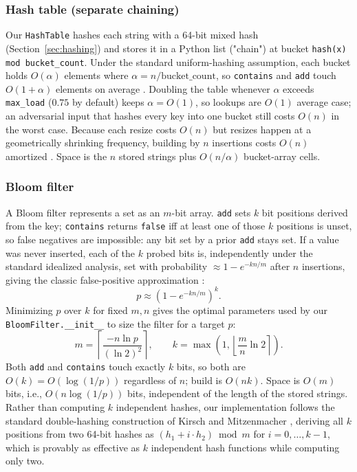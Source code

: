 \documentclass[acmsmall,screen,nonacm=true]{acmart}
\begin{document}
\subsubsection{Hash table (separate chaining)}
Our \texttt{HashTable} hashes each string with a 64-bit mixed hash
(Section~\ref{sec:hashing}) and stores it in a Python list ("chain") at
bucket \texttt{hash(x) mod bucket\_count}. Under the standard uniform-hashing
assumption, each bucket holds $O(\alpha)$ elements where $\alpha=n/\text{bucket\_count}$,
so \texttt{contains} and \texttt{add} touch $O(1+\alpha)$ elements on
average \cite{cormen2009}. Doubling the table whenever $\alpha$ exceeds
\texttt{max\_load} ($0.75$ by default) keeps $\alpha=O(1)$, so lookups are
$O(1)$ average case; an adversarial input that hashes every key into one
bucket still costs $O(n)$ in the worst case. Because each resize costs
$O(n)$ but resizes happen at a geometrically shrinking frequency, building
by $n$ insertions costs $O(n)$ amortized \cite{cormen2009}. Space is the
$n$ stored strings plus $O(n/\alpha)$ bucket-array cells.

\subsubsection{Bloom filter}
\label{sec:bloom-theory}
A Bloom filter \cite{bloom1970} represents a set as an $m$-bit array.
\texttt{add} sets $k$ bit positions derived from the key; \texttt{contains}
returns \texttt{false} iff at least one of those $k$ positions is unset, so
false negatives are impossible: any bit set by a prior \texttt{add} stays
set. If a value was never inserted, each of the $k$ probed bits is,
independently under the standard idealized analysis, set with probability
$\approx 1-e^{-kn/m}$ after $n$ insertions, giving the classic false-positive
approximation \cite{bloom1970,broder2004}:
\[
p \approx \left(1-e^{-kn/m}\right)^k .
\]
Minimizing $p$ over $k$ for fixed $m,n$ gives the optimal parameters used by
our \texttt{BloomFilter.\_\_init\_\_} to size the filter for a target $p$:
\[
m = \left\lceil \frac{-n\ln p}{(\ln 2)^2} \right\rceil, \qquad
k = \max\!\left(1, \left\lfloor\frac{m}{n}\ln 2\right\rceil\right).
\]
Both \texttt{add} and \texttt{contains} touch exactly $k$ bits, so both are
$O(k)=O(\log(1/p))$ regardless of $n$; build is $O(nk)$. Space is $O(m)$ bits,
i.e., $O(n\log(1/p))$ bits, independent of the length of the stored strings.
Rather than computing $k$ independent hashes, our implementation follows the
standard double-hashing construction of Kirsch and Mitzenmacher
\cite{kirsch2006}, deriving all $k$ positions from two 64-bit hashes as
$(h_1 + i\cdot h_2)\bmod m$ for $i=0,\dots,k-1$, which is provably as
effective as $k$ independent hash functions while computing only two.
\end{document}
